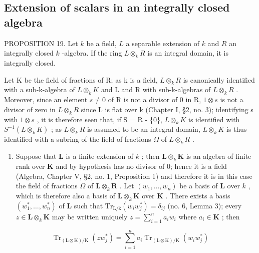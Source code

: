 \subsection{Extension of scalars in an integrally closed algebra}

PROPOSITION 19. Let \(k\) be a field, \(L\) a separable extension of \(k\) and \(R\) an integrally closed \(k\) -algebra. If the ring \(L \otimes_k R\) is an integral domain, it is integrally closed.

Let K be the field of fractions of R; as k is a field, \(L \otimes_{k} R\) is canonically identified with a sub-k-algebra of \(L \otimes_{k} K\) and L and R with sub-k-algebras of \(L \otimes_{k} R\) . Moreover, since an element \(s \neq 0\) of R is not a divisor of 0 in R, \(1 \otimes s\) is not a divisor of zero in \(L \otimes_{k} R\) since L is flat over k (Chapter I, §2, no. 3); identifying s with \(1 \otimes s\) , it is therefore seen that, if S = R - \{0\}, \(L \otimes_{k} K\) is identified with \(S^{-1}(L \otimes_{k} K)\) ; as \(L \otimes_{k} R\) is assumed to be an integral domain, \(L \otimes_{k} K\) is thus identified with a subring of the field of fractions \(\Omega\) of \(L \otimes_{k} R\) .

\begin{enumerate}
\def\labelenumi{(\arabic{enumi})}
\tightlist
\item
  Suppose that \(\mathbf{L}\) is a finite extension of \(k\) ; then \(\mathbf{L} \otimes_k \mathbf{K}\) is an algebra of finite rank over \(\mathbf{K}\) and by hypothesis has no divisor of 0; hence it is a field (Algebra, Chapter V, §2, no. 1, Proposition 1) and therefore it is in this case the field of fractions \(\Omega\) of \(\mathbf{L} \otimes_k \mathbf{R}\) . Let \((w_1, \ldots, w_n)\) be a basis of \(\mathbf{L}\) over \(k\) , which is therefore also a basis of \(\mathbf{L} \otimes_k \mathbf{K}\) over \(\mathbf{K}\) . There exists a basis \((w_1^*, \ldots, w_n^*)\) of \(\mathbf{L}\) such that \(\mathrm{Tr}_{\mathrm{L/k}}(w_i w_j^*) = \delta_{ij}\) (no. 6, Lemma 3); every \(z \in \mathbf{L} \otimes_k \mathbf{K}\) may be written uniquely \(z = \sum_{i=1}^{n} a_i w_i\) where \(a_i \in \mathbf{K}\) ; then
\end{enumerate}

\[
\operatorname{Tr} _ {(\mathrm{L} \otimes \mathrm{K}) / \mathrm{K}} (z w _ {j} ^ {*}) = \sum_ {i = 1} ^ {n} a _ {i} \operatorname{Tr} _ {(\mathrm{L} \otimes \mathrm{K}) / \mathrm{K}} (w _ {i} w _ {j} ^ {*})
\]


